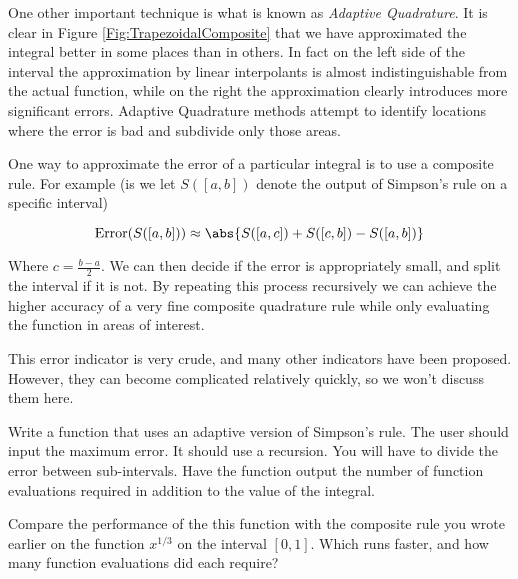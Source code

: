One other important technique is what is known as \emph{Adaptive Quadrature}. It is clear in Figure \ref{Fig:TrapezoidalComposite} that we have approximated the integral better in some places than in others. In fact on the left side of the interval the approximation by linear interpolants is almost indistinguishable from the actual function, while on the right the approximation clearly introduces more significant errors. Adaptive Quadrature methods attempt to identify locations where the error is bad and subdivide only those areas.

One way to approximate the error of a particular integral is to use a composite rule. For example (is we let $S([a,b])$ denote the output of Simpson's rule on a specific interval)

\[
\mbox{Error}(S([a,b])) \approx \abs{S([a,c]) + S([c,b]) - S([a,b])}
\]

Where $c = \frac{b-a}{2}$. We can then decide if the error is appropriately small, and split the interval if it is not. By repeating this process recursively we can achieve the higher accuracy of a very fine composite quadrature rule while only evaluating the function in areas of interest.

This error indicator is very crude, and many other indicators have been proposed. However, they can become complicated relatively quickly, so we won't discuss them here. 

\begin{problem}
Write a function that uses an adaptive version of Simpson's rule. The user should input the maximum error. It should use a recursion. You will have to divide the error between sub-intervals. Have the function output the number of function evaluations required in addition to the value of the integral.

Compare the performance of the this function with the composite rule you wrote earlier on the function $x^{1/3}$ on the interval $[0,1]$. Which runs faster, and how many function evaluations did each require?
\end{problem}
